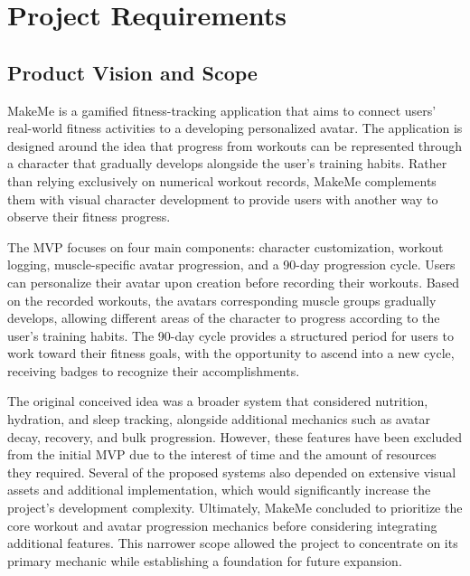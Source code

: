 \documentclass[11pt]{article}
\begin{document}
\section{Project Requirements}
\subsection{Product Vision and Scope}
MakeMe is a gamified fitness-tracking application that aims to connect users’ real-world fitness
activities to a developing personalized avatar. The application is designed around the idea that
progress from workouts can be represented through a character that gradually develops alongside
the user’s training habits. Rather than relying exclusively on numerical workout records, MakeMe
complements them with visual character development to provide users with another way to observe
their fitness progress.

The MVP focuses on four main components: character customization, workout logging, muscle-specific
avatar progression, and a 90-day progression cycle. Users can personalize their avatar upon
creation before recording their workouts. Based on the recorded workouts, the avatars
corresponding muscle groups gradually develops, allowing different areas of the character
to progress according to the user’s training habits. The 90-day cycle provides a structured
period for users to work toward their fitness goals, with the opportunity to ascend into a
new cycle, receiving badges to recognize their accomplishments.

The original conceived idea was a broader system that considered nutrition, hydration, and sleep
tracking, alongside additional mechanics such as avatar decay, recovery, and bulk progression.
However, these features have been excluded from the initial MVP due to the interest of time and
the amount of resources they required. Several of the proposed systems also depended on extensive
visual assets and additional implementation, which would significantly increase the project’s
development complexity. Ultimately, MakeMe concluded to prioritize the core workout and avatar
progression mechanics before considering integrating additional features. This narrower scope
allowed the project to concentrate on its primary mechanic while establishing a foundation for
future expansion.
\end{document}
